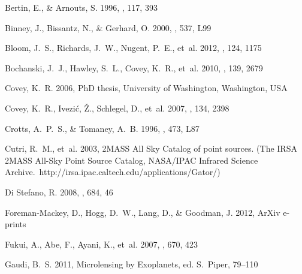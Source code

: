 \documentclass{emulateapj}
\begin{document}
\begin{thebibliography}{53}
{Bertin}, E., \& {Arnouts}, S. 1996, \aaps, 117, 393

{Binney}, J., {Bissantz}, N., \& {Gerhard}, O. 2000, \apjl, 537, L99

{Bloom}, J.~S., {Richards}, J.~W., {Nugent}, P.~E., {et~al.} 2012, \pasp, 124,
  1175

{Bochanski}, J.~J., {Hawley}, S.~L., {Covey}, K.~R., {et~al.} 2010, \aj, 139,
  2679

{Covey}, K.~R. 2006, PhD thesis, University of Washington, Washington, USA

{Covey}, K.~R., {Ivezi{\'c}}, {\v Z}., {Schlegel}, D., {et~al.} 2007, \aj, 134,
  2398

{Crotts}, A.~P.~S., \& {Tomaney}, A.~B. 1996, \apjl, 473, L87

{Cutri}, R.~M., {et~al.} 2003, {2MASS All Sky Catalog of point sources.} (The
  IRSA 2MASS All-Sky Point Source Catalog, NASA/IPAC Infrared Science
  Archive.~http://irsa.ipac.caltech.edu/applications/Gator/)

{Di Stefano}, R. 2008, \apj, 684, 46

{Foreman-Mackey}, D., {Hogg}, D.~W., {Lang}, D., \& {Goodman}, J. 2012, ArXiv
  e-prints

{Fukui}, A., {Abe}, F., {Ayani}, K., {et~al.} 2007, \apj, 670, 423

{Gaudi}, B.~S. 2011, {Microlensing by Exoplanets}, ed. S.~{Piper}, 79--110


\end{thebibliography}
\end{document}

